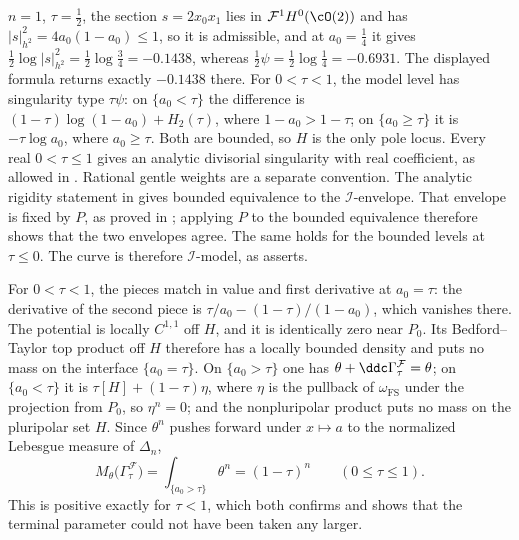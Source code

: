 \begin{example}
$n=1$, $\tau=\tfrac12$, the section $s=2x_0x_1$ lies in
$\mathcal F^{1}H^0(\cO(2))$ and has $|s|^2_{h^2}=4a_0(1-a_0)\leq1$,
so it is admissible, and at $a_0=\tfrac14$ it gives
$\tfrac12\log|s|^2_{h^2}=\tfrac12\log\tfrac34=-0.1438$, whereas
$\tfrac12\psi=\tfrac12\log\tfrac14=-0.6931$.  The displayed formula
returns exactly $-0.1438$ there.
For $0<\tau<1$, the model level has singularity type $\tau\psi$:
on $\{a_0<\tau\}$ the difference is
$(1-\tau)\log(1-a_0)+H_2(\tau)$, where $1-a_0>1-\tau$;
on $\{a_0\geq\tau\}$ it is $-\tau\log a_0$, where $a_0\geq\tau$.
Both are bounded, so $H$ is the only pole locus.
Every real $0<\tau\leq1$ gives an analytic divisorial singularity
with real coefficient, as allowed in
.  Rational gentle weights
are a separate convention.  The analytic rigidity statement in
 gives bounded equivalence to the
$\mathcal I$-envelope.  That envelope is fixed by $P$, as proved in
; applying $P$ to the bounded
equivalence therefore shows that the two envelopes agree.  The same holds for the
bounded levels at $\tau\leq0$.
The curve is therefore $\mathcal I$-model, as
 asserts.

For $0<\tau<1$, the pieces match in value and first derivative
at $a_0=\tau$: the derivative of the second piece is
$\tau/a_0-(1-\tau)/(1-a_0)$, which vanishes there.
The potential is locally $C^{1,1}$ off $H$, and it is identically
zero near $P_0$.  Its Bedford--Taylor top product off $H$ therefore
has a locally bounded density and puts no mass on the interface
$\{a_0=\tau\}$.
On $\{a_0>\tau\}$ one has
$\theta+\ddc\Gamma^{\mathcal F}_\tau=\theta$; on $\{a_0<\tau\}$ it is
$\tau[H]+(1-\tau)\eta$, where $\eta$ is the pullback of
$\omega_{\mathrm{FS}}$ under the projection from $P_0$, so
$\eta^n=0$; and the nonpluripolar product puts no mass on the pluripolar
set $H$.  Since $\theta^n$ pushes forward under $x\mapsto a$ to the
normalized Lebesgue measure of $\Delta_n$,
\[
 M_\theta\bigl(\Gamma_\tau^{\mathcal F}\bigr)
 =\int_{\{a_0>\tau\}}\theta^n
 =(1-\tau)^n
 \qquad(0\leq\tau\leq1).
\]
This is positive exactly for $\tau<1$, which both confirms
 and shows that the terminal parameter
could not have been taken any larger.


\end{example}
